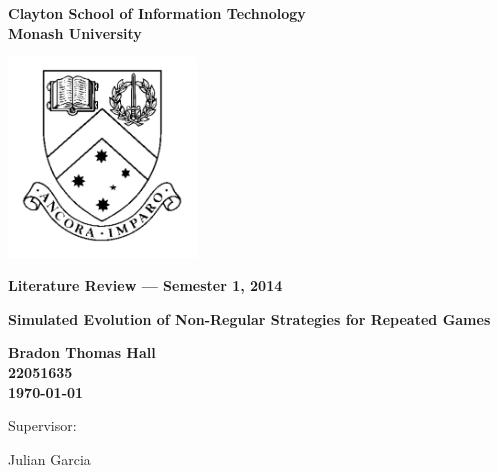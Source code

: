 \documentclass[a4paper,11pt]{article}
\begin{document}
\thispagestyle{empty} %
\renewcommand{\thepage}{\roman{page}}

\begin{spacing}{1.5}
\begin{center}
{\Large \bfseries
Clayton School of Information Technology\\
Monash University}

\vspace*{30mm}

\includegraphics[width=5cm]{MonashCrest}

\vspace*{15mm}

{\large \bfseries
Literature Review --- Semester 1, 2014
}

\vspace*{10mm}

{\LARGE \bfseries
Simulated Evolution of Non-Regular Strategies for Repeated Games
}

\vspace*{20mm}

{\large \bfseries
Bradon Thomas Hall \\22051635\\
\today

\vspace*{20mm}

Supervisor: \parbox[t]{50mm}{Julian Garcia}
}

\end{center}
\end{spacing}

\newpage

\tableofcontents
\end{document}
